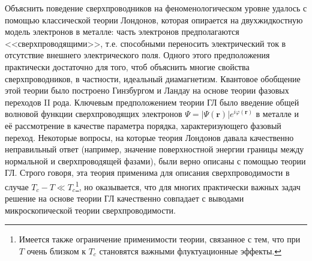 Объяснить поведение сверхпроводников на феноменологическом уровне удалось с помощью классической теории Лондонов, которая опирается на двухжидкостную модель электронов в металле: часть электронов предполагаются <<сверхпроводящими>>, т.е. способными переносить электрический ток в отсутствие внешнего электрического поля. Одного этого предположения практически достаточно для того, чтоб объяснить многие свойства сверхпроводников, в частности, идеальный диамагнетизм. Квантовое обобщение этой теории было построено Гинзбургом и Ландау на основе теории фазовых переходов II рода. Ключевым предположением теории ГЛ было введение общей волновой функции сверхпроводящих электронов $\Psi = |\Psi(\mathbf{r})| e^{i\varphi({\mathbf{r}})}$ в металле и её рассмотрение в качестве параметра порядка, характеризующего фазовый переход. Некоторые вопросы, на которые теория Лондонов давала качественно неправильный ответ (например, значение поверхностной энергии границы между нормальной и сверхпроводящей фазами), были верно описаны с помощью теории ГЛ. Строго говоря, эта теория применима для описания сверхпроводимости в случае $T_c-T \ll T_c$\footnote[1]{Имеется также ограничение применимости теории, связанное с тем, что при $T$ очень близком к $T_c$ становятся важными флуктуационные эффекты.}, но оказывается, что для многих практически важных задач решение на основе теории ГЛ качественно совпадает с выводами микроскопической теории сверхпроводимости.

